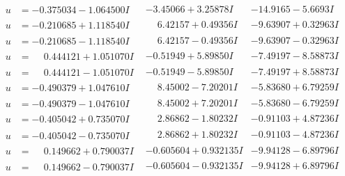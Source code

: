 \documentclass[1p]{elsarticle_modified}
\theoremstyle{definition}
\begin{document}
$$\begin{array}{c|c|c}
\begin{aligned}
u &= -0.375034 - 1.064500 I\end{aligned}
 & -3.45066 + 3.25878 I & -14.9165 - 5.6693 I \\ \hline\begin{aligned}
u &= -0.210685 + 1.118540 I\end{aligned}
 & \phantom{-}6.42157 + 0.49356 I & -9.63907 + 0.32963 I \\ \hline\begin{aligned}
u &= -0.210685 - 1.118540 I\end{aligned}
 & \phantom{-}6.42157 - 0.49356 I & -9.63907 - 0.32963 I \\ \hline\begin{aligned}
u &= \phantom{-}0.444121 + 1.051070 I\end{aligned}
 & -0.51949 + 5.89850 I & -7.49197 - 8.58873 I \\ \hline\begin{aligned}
u &= \phantom{-}0.444121 - 1.051070 I\end{aligned}
 & -0.51949 - 5.89850 I & -7.49197 + 8.58873 I \\ \hline\begin{aligned}
u &= -0.490379 + 1.047610 I\end{aligned}
 & \phantom{-}8.45002 - 7.20201 I & -5.83680 + 6.79259 I \\ \hline\begin{aligned}
u &= -0.490379 - 1.047610 I\end{aligned}
 & \phantom{-}8.45002 + 7.20201 I & -5.83680 - 6.79259 I \\ \hline\begin{aligned}
u &= -0.405042 + 0.735070 I\end{aligned}
 & \phantom{-}2.86862 - 1.80232 I & -0.91103 + 4.87236 I \\ \hline\begin{aligned}
u &= -0.405042 - 0.735070 I\end{aligned}
 & \phantom{-}2.86862 + 1.80232 I & -0.91103 - 4.87236 I \\ \hline\begin{aligned}
u &= \phantom{-}0.149662 + 0.790037 I\end{aligned}
 & -0.605604 + 0.932135 I & -9.94128 - 6.89796 I \\ \hline\begin{aligned}
u &= \phantom{-}0.149662 - 0.790037 I\end{aligned}
 & -0.605604 - 0.932135 I & -9.94128 + 6.89796 I \\ \hline\begin{aligned}

\end{aligned}
\end{array}$$
\end{document}

